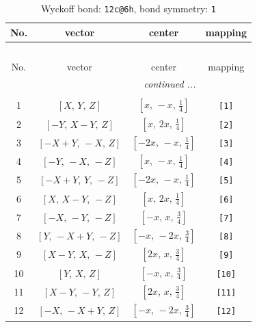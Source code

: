 \documentclass[fleqn,8pt]{jsarticle}
\begin{document}
\begin{longtable}{cccc}
\caption{Wyckoff bond: {\tt 12c@6h}, bond symmetry: {\tt 1}}
 \\
 \hline \hline
No. & vector & center & mapping \\ \hline \endfirsthead

\multicolumn{3}{l}{\tablename\ \thetable{}} \\
 \hline \hline
No. & vector & center & mapping \\ \hline \endhead

 \hline \hline
\multicolumn{3}{r}{\footnotesize\it continued ...} \\ \endfoot

 \hline \hline
\multicolumn{3}{r}{} \\ \endlastfoot

1 & $\left[ X,\, Y,\, Z \right]$ & $\left[ x,\, - x,\, \frac{1}{4} \right]$ & {\tt [1]} \\ \hline
2 & $\left[ - Y,\, X - Y,\, Z \right]$ & $\left[ x,\, 2 x,\, \frac{1}{4} \right]$ & {\tt [2]} \\ \hline
3 & $\left[ - X + Y,\, - X,\, Z \right]$ & $\left[ - 2 x,\, - x,\, \frac{1}{4} \right]$ & {\tt [3]} \\ \hline
4 & $\left[ - Y,\, - X,\, - Z \right]$ & $\left[ x,\, - x,\, \frac{1}{4} \right]$ & {\tt [4]} \\ \hline
5 & $\left[ - X + Y,\, Y,\, - Z \right]$ & $\left[ - 2 x,\, - x,\, \frac{1}{4} \right]$ & {\tt [5]} \\ \hline
6 & $\left[ X,\, X - Y,\, - Z \right]$ & $\left[ x,\, 2 x,\, \frac{1}{4} \right]$ & {\tt [6]} \\ \hline
7 & $\left[ - X,\, - Y,\, - Z \right]$ & $\left[ - x,\, x,\, \frac{3}{4} \right]$ & {\tt [7]} \\ \hline
8 & $\left[ Y,\, - X + Y,\, - Z \right]$ & $\left[ - x,\, - 2 x,\, \frac{3}{4} \right]$ & {\tt [8]} \\ \hline
9 & $\left[ X - Y,\, X,\, - Z \right]$ & $\left[ 2 x,\, x,\, \frac{3}{4} \right]$ & {\tt [9]} \\ \hline
10 & $\left[ Y,\, X,\, Z \right]$ & $\left[ - x,\, x,\, \frac{3}{4} \right]$ & {\tt [10]} \\ \hline
11 & $\left[ X - Y,\, - Y,\, Z \right]$ & $\left[ 2 x,\, x,\, \frac{3}{4} \right]$ & {\tt [11]} \\ \hline
12 & $\left[ - X,\, - X + Y,\, Z \right]$ & $\left[ - x,\, - 2 x,\, \frac{3}{4} \right]$ & {\tt [12]} \\
\end{longtable}
\end{document}
